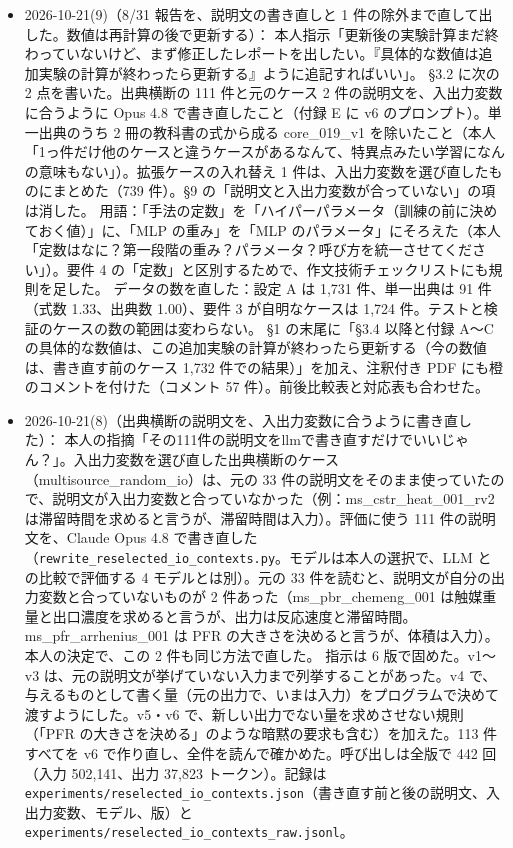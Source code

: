 \documentclass[11pt,a4paper]{jsarticle}
\begin{document}
\begin{itemize}[nosep]
  \item 2026-10-21(9)（8/31 報告を、説明文の書き直しと 1 件の除外まで直して出した。数値は再計算の後で更新する）：
    本人指示「更新後の実験計算まだ終わっていないけど、まず修正したレポートを出したい。『具体的な数値は追加実験の計算が終わったら更新する』ように追記すればいい」。
    \S 3.2 に次の 2 点を書いた。出典横断の 111 件と元のケース 2 件の説明文を、入出力変数に合うように Opus 4.8 で書き直したこと（付録 E に v6 のプロンプト）。単一出典のうち 2 冊の教科書の式から成る core\_019\_v1 を除いたこと（本人「1っ件だけ他のケースと違うケースがあるなんて、特異点みたい学習になんの意味もない」）。拡張ケースの入れ替え 1 件は、入出力変数を選び直したものにまとめた（739 件）。\S 9 の「説明文と入出力変数が合っていない」の項は消した。
    用語：「手法の定数」を「ハイパーパラメータ（訓練の前に決めておく値）」に、「MLP の重み」を「MLP のパラメータ」にそろえた（本人「定数はなに？第一段階の重み？パラメータ？呼び方を統一させてください」）。要件 4 の「定数」と区別するためで、作文技術チェックリストにも規則を足した。
    データの数を直した：設定 A は 1{,}731 件、単一出典は 91 件（式数 1.33、出典数 1.00）、要件 3 が自明なケースは 1{,}724 件。テストと検証のケースの数の範囲は変わらない。
    \S 1 の末尾に「\S 3.4 以降と付録 A〜C の具体的な数値は、この追加実験の計算が終わったら更新する（今の数値は、書き直す前のケース 1{,}732 件での結果）」を加え、注釈付き PDF にも橙のコメントを付けた（コメント 57 件）。前後比較表と対応表も合わせた。
  \item 2026-10-21(8)（出典横断の説明文を、入出力変数に合うように書き直した）：
    本人の指摘「その111件の説明文をllmで書き直すだけでいいじゃん？」。入出力変数を選び直した出典横断のケース（multisource\_random\_io）は、元の 33 件の説明文をそのまま使っていたので、説明文が入出力変数と合っていなかった（例：ms\_cstr\_heat\_001\_rv2 は滞留時間を求めると言うが、滞留時間は入力）。評価に使う 111 件の説明文を、Claude Opus 4.8 で書き直した（\texttt{rewrite\_reselected\_io\_contexts.py}。モデルは本人の選択で、LLM との比較で評価する 4 モデルとは別）。元の 33 件を読むと、説明文が自分の出力変数と合っていないものが 2 件あった（ms\_pbr\_chemeng\_001 は触媒重量と出口濃度を求めると言うが、出力は反応速度と滞留時間。ms\_pfr\_arrhenius\_001 は PFR の大きさを決めると言うが、体積は入力）。本人の決定で、この 2 件も同じ方法で直した。
    指示は 6 版で固めた。v1〜v3 は、元の説明文が挙げていない入力まで列挙することがあった。v4 で、与えるものとして書く量（元の出力で、いまは入力）をプログラムで決めて渡すようにした。v5・v6 で、新しい出力でない量を求めさせない規則（「PFR の大きさを決める」のような暗黙の要求も含む）を加えた。113 件すべてを v6 で作り直し、全件を読んで確かめた。呼び出しは全版で 442 回（入力 502{,}141、出力 37{,}823 トークン）。記録は \texttt{experiments/reselected\_io\_contexts.json}（書き直す前と後の説明文、入出力変数、モデル、版）と \texttt{experiments/reselected\_io\_contexts\_raw.jsonl}。

\end{itemize}
\end{document}
